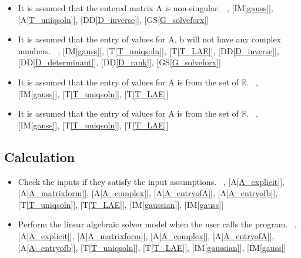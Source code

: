 \documentclass[12pt]{article}
\newcommand{\ddref}[1]{DD\ref{#1}}
\newcommand{\tref}[1]{T\ref{#1}}
\newcounter{assumpnum} %
\newcommand{\aref}[1]{A\ref{#1}}
\newcommand{\gsref}[1]{GS\ref{#1}}
\newcommand{\iref}[1]{IM\ref{#1}}
\newcounter{lcnum} %
\newcounter{calcnum} %
\begin{document}
{\begin{itemize}
\item[A\refstepcounter{assumpnum}\theassumpnum \label{A_unique}:]
It is assumed that the entered matrix A is non-singular. 
~\newline
[\iref{gaussian}], [\iref{gauss}], [\aref{T_uniqsoln}], [\ddref{D_inverse}], [\gsref{G_solveforx}]

\item[A\refstepcounter{assumpnum}\theassumpnum \label{A_complex}:]
It is assumed that the entry of values for A, b will not have any complex numbers.
~\newline
 [\iref{gaussian}], [\iref{gauss}], [\tref{T_uniqsoln}], [\tref{T_LAE}], [\ddref{D_inverse}], [\ddref{D_determinant}], [\ddref{D_rank}], [\gsref{G_solveforx}]

\item[A\refstepcounter{assumpnum}\theassumpnum \label{A_entryofA}:]
It is assumed that the entry of values for A is from the set of $\mathbb{R}$.
~\newline
 [\iref{gaussian}], [\iref{gauss}], [\tref{T_uniqsoln}], [\tref{T_LAE}]

\item[A\refstepcounter{assumpnum}\theassumpnum \label{A_entryofb}:]
It is assumed that the entry of values for A is from the set of $\mathbb{R}$.
~\newline
 [\iref{gaussian}], [\iref{gauss}], [\tref{T_uniqsoln}], [\tref{T_LAE}]




\end{itemize}

\subsection{Calculation} \label{sec_Calculation}    

\begin{itemize}
\item[C\refstepcounter{calcnum}\thecalcnum \label{C_inputs}:]
Check the inputs if they satisfy the input assumptions.
~\newline
[\gsref{G_solveforx}], [\aref{A_explicit}], [\aref{A_matrixform}],
[\aref{A_complex}], [\aref{A_entryofA}], [\aref{A_entryofb}],
[\tref{T_uniqsoln}], [\tref{T_LAE}], [\iref{gaussian}], [\iref{gauss}]

\item[C\refstepcounter{calcnum}\thecalcnum \label{C_progname}:]
Perform the linear algebraic solver model when the user calls the program.
~\newline
[\gsref{G_solveforx}], [\aref{A_explicit}], [\aref{A_matrixform}],
[\aref{A_complex}], [\aref{A_entryofA}], [\aref{A_entryofb}],
[\tref{T_uniqsoln}], [\tref{T_LAE}], [\iref{gaussian}], [\iref{gauss}]


\end{itemize}}
\end{document}
